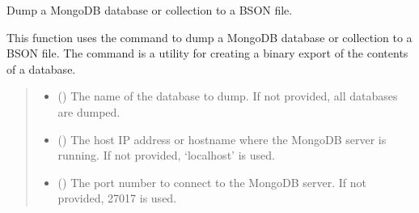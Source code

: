 \documentclass[letterpaper,10pt,english]{sphinxmanual}
\begin{document}
\begin{fulllineitems}
\label{\detokenize{forensicfit.database.database:forensicfit.database.database.dump}}
\pysigstartsignatures
{}
\pysigstopsignatures
\sphinxAtStartPar
Dump a MongoDB database or collection to a BSON file.

\sphinxAtStartPar
This function uses the  command to dump a MongoDB database or collection to a BSON
file. The  command is a utility for creating a binary export of the contents of a
database.
\begin{quote}\begin{description}
\begin{itemize}
\item {} 
\sphinxAtStartPar
{} (\sphinxstyleliteralemphasis{\sphinxupquote{, }}) \textendash{} The name of the database to dump. If not provided, all databases are dumped.

\item {} 
\sphinxAtStartPar
{} (\sphinxstyleliteralemphasis{\sphinxupquote{, }}) \textendash{} The host IP address or hostname where the MongoDB server is running. If not provided,
‘localhost’ is used.

\item {} 
\sphinxAtStartPar
{} (\sphinxstyleliteralemphasis{\sphinxupquote{, }}) \textendash{} The port number to connect to the MongoDB server. If not provided, 27017 is used.


\end{itemize}
\end{description}
\end{quote}
\end{fulllineitems}
\end{document}
